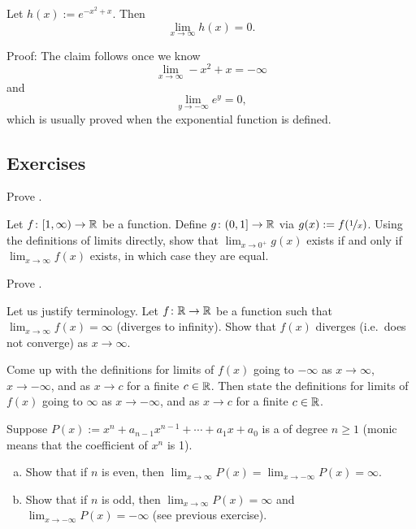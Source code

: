 \begin{example}
Let $h(x) := e^{-x^2+x}$.  Then
\begin{equation*}
\lim_{x\to \infty} h(x) = 0 .
\end{equation*}

Proof:
The claim follows once we know
\begin{equation*}
\lim_{x\to \infty} -x^2+x = -\infty
\end{equation*}
and
\begin{equation*}
\lim_{y\to -\infty} e^y = 0 ,
\end{equation*}
which is usually proved when the exponential function is defined.
\end{example}

\subsection{Exercises}

\begin{exercise}
Prove .
\end{exercise}

\begin{exercise}
Let $f \colon [1,\infty) \to {\mathbb{R}}$ be a function.  Define
$g \colon (0,1] \to {\mathbb{R}}$ via $g(x) := f(\nicefrac{1}{x})$.
Using the definitions of limits directly,
show that $\lim_{x\to 0^+} g(x)$
exists if and only if $\lim_{x\to \infty} f(x)$ exists, in which
case they are equal.
\end{exercise}

\begin{exercise}
Prove .
\end{exercise}

\begin{exercise}
Let us justify terminology.
Let $f \colon {\mathbb{R}} \to {\mathbb{R}}$ be a function such that
$\lim_{x \to \infty} f(x) = \infty$ (diverges to infinity).
Show that $f(x)$ diverges (i.e.\ does not converge) as $x \to \infty$.
\end{exercise}

\begin{exercise}
Come up with the definitions for limits of $f(x)$ going to $-\infty$ as $x \to
\infty$, $x \to -\infty$, and as $x \to c$ for a finite $c \in {\mathbb{R}}$.
Then state the definitions for limits of $f(x)$ going to $\infty$ 
as $x \to -\infty$, and as $x \to c$ for a finite $c \in {\mathbb{R}}$.
\end{exercise}

\begin{exercise}
Suppose $P(x) := x^n + a_{n-1} x^{n-1} + \cdots + a_1 x + a_0$ is a \emph{}
of degree $n \geq 1$ (monic means that the coefficient of $x^n$ is 1).
\begin{enumerate}[a)]
\item
Show that if $n$ is even, then $\lim_{x\to\infty} P(x) = 
\lim_{x\to-\infty} P(x) = \infty$.
\item
Show that if $n$ is odd, then
$\lim_{x\to\infty} P(x) = \infty$ and
$\lim_{x\to-\infty} P(x) = -\infty$ (see previous exercise).
\end{enumerate}
\end{exercise}

